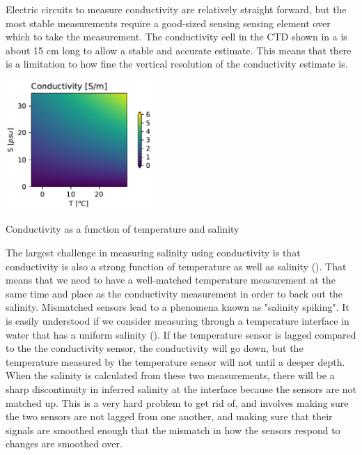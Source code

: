 Electric circuits to measure conductivity are relatively straight forward, but the most stable measurements require a good-sized sensing sensing element over which to take the measurement.  The conductivity cell in the CTD shown in a is about 15 cm long to allow a stable and accurate estimate.  This means that there is a limitation to how fine the vertical resolution of the conductivity estimate is.

\begin{marginfigure}
\begin{center}
    \includegraphics[width=2.2in]{./figs/Conductivity}
    \caption{Conductivity as a function of temperature and salinity}
    \label{fig:Conductivity}
\end{center}
\end{marginfigure}

The largest challenge in measuring salinity using conductivity is that conductivity is also a strong function of temperature as well as salinity ().  That means that we need to have a well-matched temperature measurement at the same time and place as the conductivity measurement in order to back out the salinity.  Mismatched sensors lead to a phenomena known as "salinity spiking".  It is easily understood if we consider measuring through a temperature interface in water that  has a uniform salinity ().  If the temperature sensor is lagged compared to the the conductivity sensor, the conductivity will go down, but the temperature measured by the temperature sensor will not until a deeper depth.  When the salinity is calculated from these two measurements, there will be a sharp discontinuity in inferred salinity at the interface because the sensors are not matched up. This is a very hard problem to get rid of, and involves making sure the two sensors are not lagged from one another, and making sure that their signals are smoothed enough that the mismatch in how the sensors respond to changes are smoothed over.  

